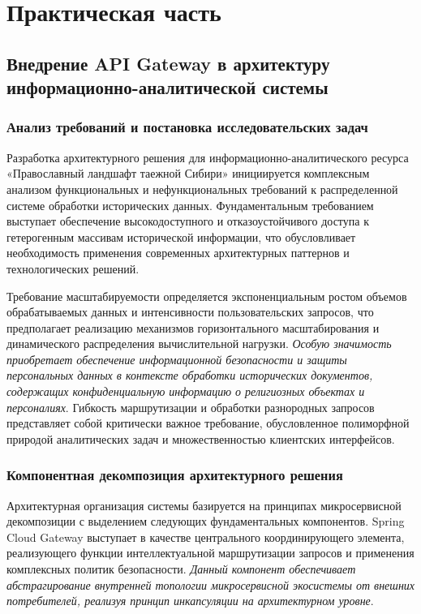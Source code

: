 \chapter{Практическая часть}


\section{Внедрение API Gateway в архитектуру информационно-аналитической системы}

\subsection{Анализ требований и постановка исследовательских задач}

Разработка архитектурного решения для информационно-аналитического ресурса «Православный ландшафт таежной Сибири» инициируется комплексным анализом функциональных и нефункциональных требований к распределенной системе обработки исторических данных. Фундаментальным требованием выступает обеспечение высокодоступного и отказоустойчивого доступа к гетерогенным массивам исторической информации, что обусловливает необходимость применения современных архитектурных паттернов и технологических решений.

Требование масштабируемости определяется экспоненциальным ростом объемов обрабатываемых данных и интенсивности пользовательских запросов, что предполагает реализацию механизмов горизонтального масштабирования и динамического распределения вычислительной нагрузки. \textit{Особую значимость приобретает обеспечение информационной безопасности и защиты персональных данных в контексте обработки исторических документов, содержащих конфиденциальную информацию о религиозных объектах и персоналиях}. Гибкость маршрутизации и обработки разнородных запросов представляет собой критически важное требование, обусловленное полиморфной природой аналитических задач и множественностью клиентских интерфейсов.

\subsection{Компонентная декомпозиция архитектурного решения}

Архитектурная организация системы базируется на принципах микросервисной декомпозиции с выделением следующих фундаментальных компонентов. Spring Cloud Gateway выступает в качестве центрального координирующего элемента, реализующего функции интеллектуальной маршрутизации запросов и применения комплексных политик безопасности. \textit{Данный компонент обеспечивает абстрагирование внутренней топологии микросервисной экосистемы от внешних потребителей, реализуя принцип инкапсуляции на архитектурном уровне}.

